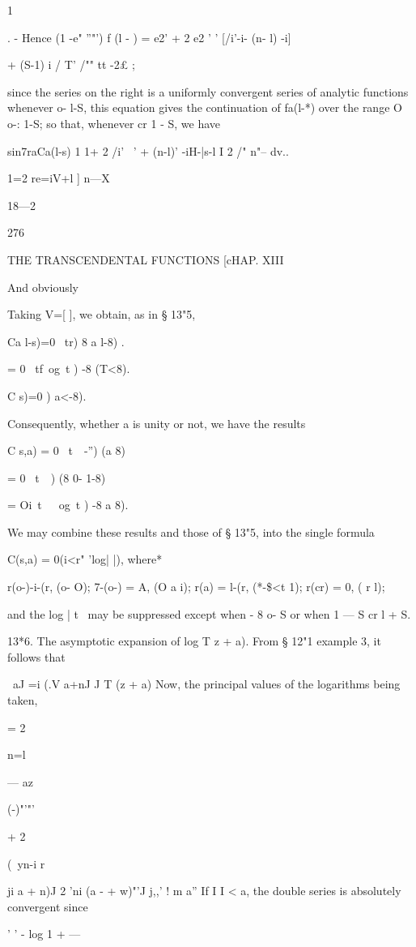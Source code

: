 {{1 %

. - Hence (1 -e" ''"') f (l - ) = e2' + 2 e2 ' ' [/i'-i- (n- l) -i]

+ (S-1) i / T' /"" tt -2£ ;

since the series on the right is a uniformly convergent series of
analytic functions whenever o- l-S, this equation gives the
continuation of fa(l-*) over the range O o-: 1-S; so that, whenever cr
1 - S, we have

sin7raCa(l-s) 1 1+ 2 /i' ~' + (n-l)' -iH-|s-l I 2 /" n"-- dv..

1=2 re=iV+l ] n—X

18—2

276

THE TRANSCENDENTAL FUNCTIONS [cHAP. XIII

And obviously

Taking V=[ ], we obtain, as in § 13"5,

Ca l-s)=0 \ tr) 8 a l-8) .

= 0 \ tf\ og\ t ) -8 (T<8).

C s)=0 ) a<-8).

Consequently, whether a is unity or not, we have the results

C s,a) = 0 \ t\ \ -'') (a 8)

= 0 \ t\ \ ) (8 0- 1-8)

= Oi\ t\ \ \ og\ t ) -8 a 8).

We may combine these results and those of § 13"5, into the single
formula

C(s,a) = 0(i<r" 'log| |), where*

r(o-)-i-(r, (o- O); 7-(o-) = A, (O a i); r(a) = l-(r, (*-\$<t 1);
r(cr) = 0, ( r l);

and the log | t \ may be suppressed except when - 8 o- S or when 1 — S
cr l + S.

13*6. The asymptotic expansion of log T z + a). From § 12"1 example 3,
it follows that

\ aJ =i (.V a+nJ J T (z + a) Now, the principal values of the
logarithms being taken,

= 2

n=l

— az

  (-)"'"'

+ 2

(\ yn-i r

ji a + n)J 2 'ni (a - + w)"'J j,,' ! m a'' If I I < a, the double
series is absolutely convergent since

' ' - log 1 + —

}}
